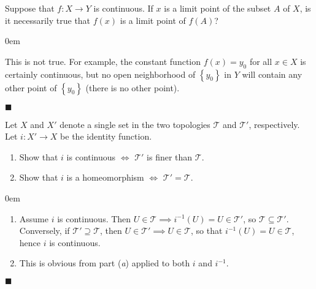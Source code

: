 \documentclass[12pt]{article}
\renewcommand{\qed}{\hfill$\blacksquare$}
\renewenvironment{proof}{\begin{addmargin}[1em]{0em}\begin{newproof}}{\end{newproof}\end{addmargin}\qed}
\newenvironment{problem}[2][Exercise]{\begin{trivlist}
\item[\hskip \labelsep {\bfseries #1}\hskip \labelsep {\bfseries #2.}]}{\end{trivlist}}
\begin{document}
\begin{problem}{18.2}
	Suppose that $f:X\rightarrow Y$ is continuous. If $x$ is a limit point of the subset $A$ of $X$, is it necessarily true that $f\left(x\right)$ is a limit point of $f\left(A\right)$?
\end{problem}
\begin{proof}
	This is not true. For example, the constant function $f\left(x\right)=y_0$ for all $x\in X$ is certainly continuous, but no open neighborhood of $\left\{y_0\right\}$ in $Y$ will contain any other point of $\left\{y_0\right\}$ (there is no other point).
\end{proof}


\begin{problem}{18.3}
Let $X$ and $X'$ denote a single set in the two topologies $\mathcal{T}$ and $\mathcal{T}'$, respectively. Let $i:X'\rightarrow X$ be the identity function.
\begin{enumerate}[label=(\alph*)]
	\item Show that $i$ is continuous $\iff$ $\mathcal{T}'$ is finer than $\mathcal{T}$.
	\item Show that $i$ is a homeomorphism $\iff$ $\mathcal{T}'=\mathcal{T}$.
\end{enumerate}
\end{problem}
\begin{proof}
\begin{enumerate}[label=(\alph*)]
	\item Assume $i$ is continuous. Then $U \in \mathcal{T} \implies i^{-1}\left(U\right)=U \in \mathcal{T}'$, so $\mathcal{T}\subseteq \mathcal{T}'$. Conversely, if $\mathcal{T}'\supseteq \mathcal{T}$, then $U \in \mathcal{T}' \implies U \in \mathcal{T}$, so that $i^{-1}\left(U\right) = U \in \mathcal{T}$, hence $i$ is continuous.
	\item This is obvious from part (\textit{a}) applied to both $i$ and $i^{-1}$.
\end{enumerate}
\end{proof}
\end{document}
